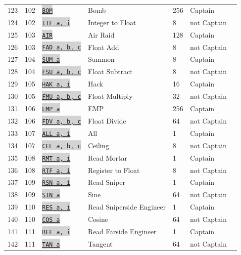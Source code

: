 \documentclass{article}
\newcommand{\vnscode}[1]{\colorbox{lightgray}{\lstinline[language=vns]{#1}}}
\begin{document}
\begin{longtable}{lllllll}
    123 & 102 & \hyperref[table:combat]{\vnscode{BOM}} & Bomb & 256 & Captain \\
    124 & 102 & \hyperref[table:float]{\vnscode{ITF a, i}} & Integer to Float & 8 & not Captain \\
    125 & 103 & \hyperref[table:combat]{\vnscode{AIR}} & Air Raid & 128 & Captain \\
    126 & 103 & \hyperref[table:float]{\vnscode{FAD a, b, c}} & Float Add & 8 & not Captain \\
    127 & 104 & \hyperref[table:movement]{\vnscode{SUM a}} & Summon & 8 & Captain \\
    128 & 104 & \hyperref[table:float]{\vnscode{FSU a, b, c}} & Float Subtract & 8 & not Captain \\
    129 & 105 & \hyperref[table:communication]{\vnscode{HAK a, i}} & Hack & 16 & Captain \\
    130 & 105 & \hyperref[table:float]{\vnscode{FMU a, b, c}} & Float Multiply & 32 & not Captain \\
    131 & 106 & \hyperref[table:communication]{\vnscode{EMP a}} & EMP & 256 & Captain \\
    132 & 106 & \hyperref[table:float]{\vnscode{FDV a, b, c}} & Float Divide & 64 & not Captain \\
    133 & 107 & \hyperref[table:communication]{\vnscode{ALL a, i}} & All & 1 & Captain \\
    134 & 107 & \hyperref[table:float]{\vnscode{CEL a, b, c}} & Ceiling & 8 & not Captain \\
    135 & 108 & \hyperref[table:communication]{\vnscode{RMT a, i}} & Read Mortar & 1 & Captain \\
    136 & 108 & \hyperref[table:float]{\vnscode{RTF a, i}} & Register to Float & 8 & not Captain \\
    137 & 109 & \hyperref[table:communication]{\vnscode{RSN a, i}} & Read Sniper & 1 & Captain \\
    138 & 109 & \hyperref[table:float]{\vnscode{SIN a}} & Sine & 64 & not Captain \\
    139 & 110 & \hyperref[table:communication]{\vnscode{RES a, i}} & Read Sniperside Engineer & 1 & Captain \\
    140 & 110 & \hyperref[table:float]{\vnscode{COS a}} & Cosine & 64 & not Captain \\
    141 & 111 & \hyperref[table:communication]{\vnscode{REF a, i}} & Read Farside Engineer & 1 & Captain \\
    142 & 111 & \hyperref[table:float]{\vnscode{TAN a}} & Tangent & 64 & not Captain \\

\end{longtable}
\end{document}
